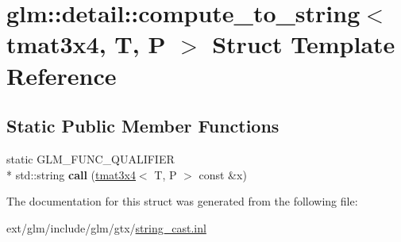 \hypertarget{structglm_1_1detail_1_1compute__to__string_3_01tmat3x4_00_01_t_00_01_p_01_4}{\section{glm\-:\-:detail\-:\-:compute\-\_\-to\-\_\-string$<$ tmat3x4, T, P $>$ Struct Template Reference}
\label{structglm_1_1detail_1_1compute__to__string_3_01tmat3x4_00_01_t_00_01_p_01_4}
}
\subsection*{Static Public Member Functions}
\begin{DoxyCompactItemize}
\item 
\hypertarget{structglm_1_1detail_1_1compute__to__string_3_01tmat3x4_00_01_t_00_01_p_01_4_ad496094b177c77e467902ffb5bc3b0db}{static G\-L\-M\-\_\-\-F\-U\-N\-C\-\_\-\-Q\-U\-A\-L\-I\-F\-I\-E\-R \\*
std\-::string {\bfseries call} (\hyperlink{structglm_1_1tmat3x4}{tmat3x4}$<$ T, P $>$ const \&x)}\label{structglm_1_1detail_1_1compute__to__string_3_01tmat3x4_00_01_t_00_01_p_01_4_ad496094b177c77e467902ffb5bc3b0db}

\end{DoxyCompactItemize}


The documentation for this struct was generated from the following file\-:\begin{DoxyCompactItemize}
\item 
ext/glm/include/glm/gtx/\hyperlink{string__cast_8inl}{string\-\_\-cast.\-inl}\end{DoxyCompactItemize}
